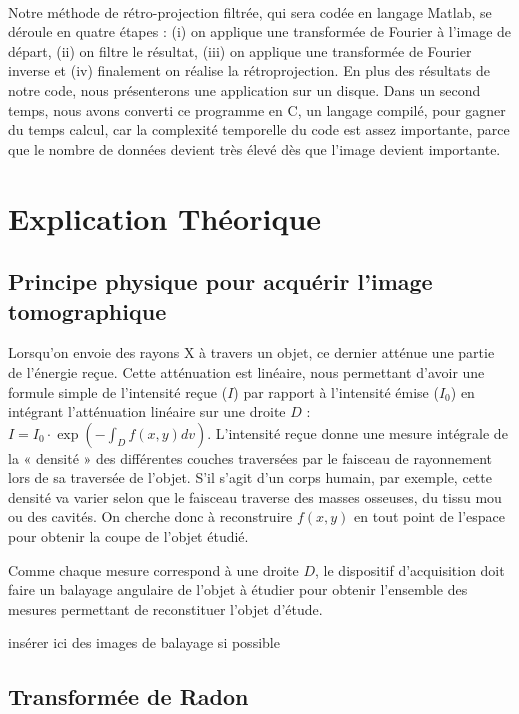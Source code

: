 \documentclass[conference]{IEEEtran}
\begin{document}
\\
Notre méthode de rétro-projection filtrée, qui sera codée en langage Matlab, se déroule en quatre étapes : (i) on applique une transformée de Fourier à l’image de départ, (ii)  on filtre le résultat, (iii) on applique une transformée de Fourier inverse et (iv) finalement on réalise la rétroprojection. En plus des résultats de notre code, nous présenterons une application sur un disque. Dans un second temps, nous avons converti ce programme en C, un langage compilé, pour gagner du temps calcul, car la complexité temporelle du code est assez importante, parce que le nombre de données devient très élevé dès que l’image devient importante.

\section{Explication Théorique}

\subsection{Principe physique pour acquérir l'image tomographique}

Lorsqu'on envoie des rayons X à travers un objet, ce dernier atténue une partie de l'énergie reçue.  Cette atténuation est linéaire, nous permettant d'avoir une formule simple de l'intensité reçue ($I$) par rapport à l'intensité émise ($I_0$) en intégrant l'atténuation linéaire sur une droite $D$ : $
I=I_0 \cdot \exp(- \int_{D} f(x,y) dv )
$.
L’intensité reçue donne une mesure intégrale de la « densité » des différentes couches traversées par le faisceau de rayonnement lors de sa traversée de l’objet. S’il s’agit d’un corps humain, par exemple, cette densité va varier selon que le faisceau traverse des masses osseuses, du tissu mou ou des cavités.
On cherche donc à reconstruire $f(x,y)$ en tout point de l’espace pour obtenir la coupe de l’objet étudié.

Comme chaque mesure correspond à une droite $D$, le dispositif d'acquisition doit faire un balayage angulaire de l'objet à étudier pour obtenir l'ensemble des mesures permettant de reconstituer l'objet d'étude.

insérer ici des images de balayage si possible

\subsection{Transformée de Radon}
\end{document}
